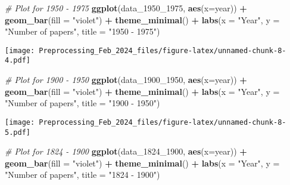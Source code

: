 \documentclass[
]{article}
\newenvironment{Shaded}{\begin{snugshade}}{\end{snugshade}}
\newcommand{\AttributeTok}[1]{\textcolor[rgb]{0.13,0.29,0.53}{#1}}
\newcommand{\CommentTok}[1]{\textcolor[rgb]{0.56,0.35,0.01}{\textit{#1}}}
\newcommand{\FunctionTok}[1]{\textcolor[rgb]{0.13,0.29,0.53}{\textbf{#1}}}
\newcommand{\NormalTok}[1]{#1}
\newcommand{\SpecialCharTok}[1]{\textcolor[rgb]{0.81,0.36,0.00}{\textbf{#1}}}
\newcommand{\StringTok}[1]{\textcolor[rgb]{0.31,0.60,0.02}{#1}}
\begin{document}
\begin{Shaded}
\begin{Highlighting}[]
\CommentTok{\# Plot for 1950 {-} 1975}
\FunctionTok{ggplot}\NormalTok{(data\_1950\_1975, }\FunctionTok{aes}\NormalTok{(}\AttributeTok{x=}\NormalTok{year)) }\SpecialCharTok{+}
  \FunctionTok{geom\_bar}\NormalTok{(}\AttributeTok{fill =} \StringTok{"violet"}\NormalTok{) }\SpecialCharTok{+}
  \FunctionTok{theme\_minimal}\NormalTok{() }\SpecialCharTok{+}
\FunctionTok{labs}\NormalTok{(}\AttributeTok{x =} \StringTok{"Year"}\NormalTok{, }\AttributeTok{y =} \StringTok{"Number of papers"}\NormalTok{, }\AttributeTok{title =} \StringTok{"1950 {-} 1975"}\NormalTok{)}
\end{Highlighting}
\end{Shaded}

\texttt{[image: Preprocessing\_Feb\_2024\_files/figure-latex/unnamed-chunk-8-4.pdf]}

\begin{Shaded}
\begin{Highlighting}[]
\CommentTok{\# Plot for 1900 {-} 1950}
\FunctionTok{ggplot}\NormalTok{(data\_1900\_1950, }\FunctionTok{aes}\NormalTok{(}\AttributeTok{x=}\NormalTok{year)) }\SpecialCharTok{+}
  \FunctionTok{geom\_bar}\NormalTok{(}\AttributeTok{fill =} \StringTok{"violet"}\NormalTok{) }\SpecialCharTok{+}
  \FunctionTok{theme\_minimal}\NormalTok{() }\SpecialCharTok{+}
\FunctionTok{labs}\NormalTok{(}\AttributeTok{x =} \StringTok{"Year"}\NormalTok{, }\AttributeTok{y =} \StringTok{"Number of papers"}\NormalTok{, }\AttributeTok{title =} \StringTok{"1900 {-} 1950"}\NormalTok{)}
\end{Highlighting}
\end{Shaded}

\texttt{[image: Preprocessing\_Feb\_2024\_files/figure-latex/unnamed-chunk-8-5.pdf]}

\begin{Shaded}
\begin{Highlighting}[]
\CommentTok{\# Plot for 1824 {-} 1900}
\FunctionTok{ggplot}\NormalTok{(data\_1824\_1900, }\FunctionTok{aes}\NormalTok{(}\AttributeTok{x=}\NormalTok{year)) }\SpecialCharTok{+}
  \FunctionTok{geom\_bar}\NormalTok{(}\AttributeTok{fill =} \StringTok{"violet"}\NormalTok{) }\SpecialCharTok{+}
  \FunctionTok{theme\_minimal}\NormalTok{() }\SpecialCharTok{+}
\FunctionTok{labs}\NormalTok{(}\AttributeTok{x =} \StringTok{"Year"}\NormalTok{, }\AttributeTok{y =} \StringTok{"Number of papers"}\NormalTok{, }\AttributeTok{title =} \StringTok{"1824 {-} 1900"}\NormalTok{)}
\end{Highlighting}
\end{Shaded}
\end{document}
